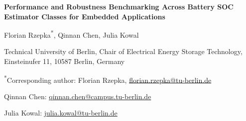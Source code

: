 \documentclass[11pt,a4paper]{article}
\begin{document}
\begin{center}
{\LARGE\bfseries Performance and Robustness Benchmarking Across Battery SOC Estimator Classes for Embedded Applications\par}
\vspace{1.2em}
{\large Florian Rzepka\textsuperscript{*}, Qinnan Chen, Julia Kowal\par}
\vspace{0.6em}
Technical University of Berlin, Chair of Electrical Energy Storage Technology,\\
Einsteinufer 11, 10587 Berlin, Germany
\end{center}

\textsuperscript{*}Corresponding author: Florian Rzepka, \href{mailto:florian.rzepka@tu-berlin.de}{florian.rzepka@tu-berlin.de}

Qinnan Chen: \href{mailto:qinnan.chen@campus.tu-berlin.de}{qinnan.chen@campus.tu-berlin.de}

Julia Kowal: \href{mailto:julia.kowal@tu-berlin.de}{julia.kowal@tu-berlin.de}
\end{document}
